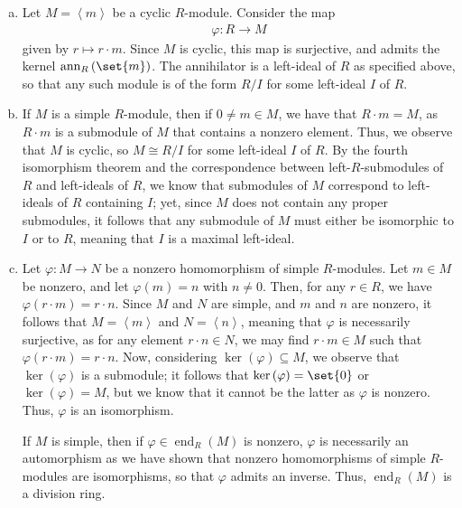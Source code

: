 \documentclass[10pt]{mypackage}
\begin{document}
\begin{solution}\hfill
  \begin{enumerate}[(a)]
    \item Let $M = \left\langle m \right\rangle$ be a cyclic $R$-module. Consider the map
      \begin{align*}
        \varphi\colon R\rightarrow M
      \end{align*}
      given by $r\mapsto r\cdot m$. Since $M$ is cyclic, this map is surjective, and admits the kernel $\operatorname{ann}_R\left( \set{m} \right)$. The annihilator is a left-ideal of $R$ as specified above, so that any such module is of the form $R/I$ for some left-ideal $I$ of $R$.
    \item If $M$ is a simple $R$-module, then if $0\neq m\in M$, we have that $R\cdot m = M$, as $R\cdot m$ is a submodule of $M$ that contains a nonzero element. Thus, we observe that $M$ is cyclic, so $M \cong R/I$ for some left-ideal $I$ of $R$. By the fourth isomorphism theorem and the correspondence between left-$R$-submodules of $R$ and left-ideals of $R$, we know that submodules of $M$ correspond to left-ideals of $R$ containing $I$; yet, since $M$ does not contain any proper submodules, it follows that any submodule of $M$ must either be isomorphic to $I$ or to $R$, meaning that $I$ is a maximal left-ideal.
    \item Let $\varphi\colon M\rightarrow N$ be a nonzero homomorphism of simple $R$-modules. Let $m\in M$ be nonzero, and let $\varphi(m) = n$ with $n\neq 0$. Then, for any $r\in R$, we have $\varphi\left( r\cdot m \right) = r\cdot n$. Since $M$ and $N$ are simple, and $m$ and $n$ are nonzero, it follows that $M = \left\langle m \right\rangle$ and $N = \left\langle n \right\rangle$, meaning that $\varphi$ is necessarily surjective, as for any element $r\cdot n\in N$, we may find $r\cdot m\in M$ such that $\varphi\left( r\cdot m \right) = r\cdot n$. Now, considering $\ker\left( \varphi \right)\subseteq M$, we observe that $\ker\left( \varphi \right)$ is a submodule; it follows that $\ker\left( \varphi \right) = \set{0}$ or $\ker\left( \varphi \right) = M$, but we know that it cannot be the latter as $\varphi$ is nonzero. Thus, $\varphi$ is an isomorphism.\newline

      If $M$ is simple, then if $\varphi\in \operatorname{end}_R\left( M \right)$ is nonzero, $\varphi$ is necessarily an automorphism as we have shown that nonzero homomorphisms of simple $R$-modules are isomorphisms, so that $\varphi$ admits an inverse. Thus, $ \operatorname{end}_R\left( M \right) $ is a division ring.
  \end{enumerate}
\end{solution}
\end{document}
